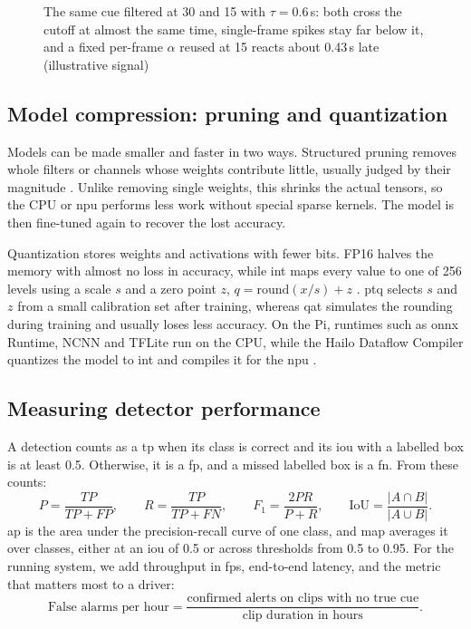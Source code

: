 \begin{figure}[htbp]
\centering
\resizebox{\linewidth}{!}{}
\caption{The same cue filtered at 30 and 15  with $\tau=0.6$\,s: both cross the cutoff at almost the same time, single-frame spikes stay far below it, and a fixed per-frame $\alpha$ reused at 15  reacts about 0.43\,s late (illustrative signal)}
\label{fig:ch3-ema-weights}
\end{figure}


\subsection{Model compression: pruning and quantization}

Models can be made smaller and faster in two ways. Structured pruning removes whole filters or channels whose weights contribute little, usually judged by their magnitude \cite{r47}. Unlike removing single weights, this shrinks the actual tensors, so the CPU or \gls{npu} performs less work without special sparse kernels. The model is then fine-tuned again to recover the lost accuracy.

Quantization stores weights and activations with fewer bits. FP16 halves the memory with almost no loss in accuracy, while \gls{int} maps every value to one of 256 levels using a scale $s$ and a zero point $z$, $q=\mathrm{round}(x/s)+z$ \cite{r48}. \gls{ptq} selects $s$ and $z$ from a small calibration set after training, whereas \gls{qat} simulates the rounding during training and usually loses less accuracy. On the Pi, runtimes such as \gls{onnx} Runtime, NCNN \cite{r73} and TFLite run on the CPU, while the Hailo Dataflow Compiler quantizes the model to \gls{int} and compiles it for the \gls{npu} \cite{r70}.


\subsection{Measuring detector performance}

A detection counts as a \gls{tp} when its class is correct and its \gls{iou} with a labelled box is at least 0.5. Otherwise, it is a \gls{fp}, and a missed labelled box is a \gls{fn}. From these counts:
\begin{equation}
P=\frac{TP}{TP+FP},\qquad R=\frac{TP}{TP+FN},\qquad F_1=\frac{2PR}{P+R},\qquad \mathrm{IoU}=\frac{|A\cap B|}{|A\cup B|}.
\end{equation}
\gls{ap} is the area under the precision-recall curve of one class, and \gls{map} averages it over classes, either at an \gls{iou} of 0.5 or across thresholds from 0.5 to 0.95. For the running system, we add throughput in \gls{fps}, end-to-end latency, and the metric that matters most to a driver:
\begin{equation}
\text{False alarms per hour} = \frac{\text{confirmed alerts on clips with no true cue}}{\text{clip duration in hours}}.
\end{equation}


